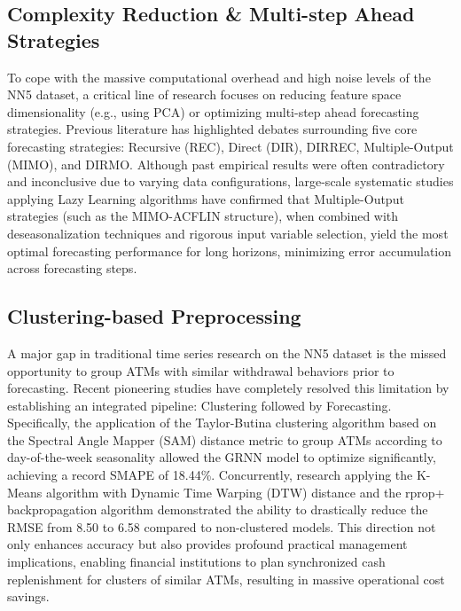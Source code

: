\documentclass[conference, 12pt, onecolumn]{IEEEtran}
\begin{document}
\subsection{Complexity Reduction \& Multi-step Ahead Strategies}
To cope with the massive computational overhead and high noise levels of the NN5 dataset, a critical line of research focuses on reducing feature space dimensionality (e.g., using PCA) or optimizing multi-step ahead forecasting strategies. Previous literature has highlighted debates surrounding five core forecasting strategies: Recursive (REC), Direct (DIR), DIRREC, Multiple-Output (MIMO), and DIRMO. Although past empirical results were often contradictory and inconclusive due to varying data configurations, large-scale systematic studies applying Lazy Learning algorithms have confirmed that Multiple-Output strategies (such as the MIMO-ACFLIN structure), when combined with deseasonalization techniques and rigorous input variable selection, yield the most optimal forecasting performance for long horizons, minimizing error accumulation across forecasting steps.

\subsection{Clustering-based Preprocessing}
A major gap in traditional time series research on the NN5 dataset is the missed opportunity to group ATMs with similar withdrawal behaviors prior to forecasting. Recent pioneering studies have completely resolved this limitation by establishing an integrated pipeline: Clustering followed by Forecasting. Specifically, the application of the Taylor-Butina clustering algorithm based on the Spectral Angle Mapper (SAM) distance metric to group ATMs according to day-of-the-week seasonality allowed the GRNN model to optimize significantly, achieving a record SMAPE of 18.44\%. Concurrently, research applying the K-Means algorithm with Dynamic Time Warping (DTW) distance and the rprop+ backpropagation algorithm demonstrated the ability to drastically reduce the RMSE from 8.50 to 6.58 compared to non-clustered models. This direction not only enhances accuracy but also provides profound practical management implications, enabling financial institutions to plan synchronized cash replenishment for clusters of similar ATMs, resulting in massive operational cost savings.
\end{document}
